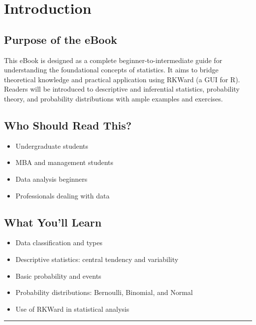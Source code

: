 \documentclass[
  letterpaper,
  DIV=11,
  numbers=noendperiod]{scrreprt}
\providecommand{\tightlist}{%
  \setlength{\itemsep}{0pt}\setlength{\parskip}{0pt}}
\begin{document}
\section{Introduction}\label{introduction-1}

\subsection{Purpose of the eBook}\label{purpose-of-the-ebook}

This eBook is designed as a complete beginner-to-intermediate guide for
understanding the foundational concepts of statistics. It aims to bridge
theoretical knowledge and practical application using RKWard (a GUI for
R). Readers will be introduced to descriptive and inferential
statistics, probability theory, and probability distributions with ample
examples and exercises.

\subsection{Who Should Read This?}\label{who-should-read-this}

\begin{itemize}
\tightlist
\item
  Undergraduate students
\item
  MBA and management students
\item
  Data analysis beginners
\item
  Professionals dealing with data
\end{itemize}

\subsection{What You'll Learn}\label{what-youll-learn}

\begin{itemize}
\tightlist
\item
  Data classification and types
\item
  Descriptive statistics: central tendency and variability
\item
  Basic probability and events
\item
  Probability distributions: Bernoulli, Binomial, and Normal
\item
  Use of RKWard in statistical analysis
\end{itemize}

\begin{center}\rule{0.5\linewidth}{0.5pt}\end{center}
\end{document}

